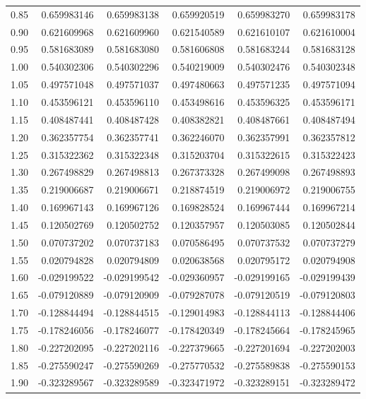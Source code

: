 \documentclass[11pt,a4paper]{article}
\begin{document}
\begin{longtable}{rrrrrr}
0.85 & 0.659983146 & 0.659983138 & 0.659920519 & 0.659983270 & 0.659983178 \\
0.90 & 0.621609968 & 0.621609960 & 0.621540589 & 0.621610107 & 0.621610004 \\
0.95 & 0.581683089 & 0.581683080 & 0.581606808 & 0.581683244 & 0.581683128 \\
1.00 & 0.540302306 & 0.540302296 & 0.540219009 & 0.540302476 & 0.540302348 \\
1.05 & 0.497571048 & 0.497571037 & 0.497480663 & 0.497571235 & 0.497571094 \\
1.10 & 0.453596121 & 0.453596110 & 0.453498616 & 0.453596325 & 0.453596171 \\
1.15 & 0.408487441 & 0.408487428 & 0.408382821 & 0.408487661 & 0.408487494 \\
1.20 & 0.362357754 & 0.362357741 & 0.362246070 & 0.362357991 & 0.362357812 \\
1.25 & 0.315322362 & 0.315322348 & 0.315203704 & 0.315322615 & 0.315322423 \\
1.30 & 0.267498829 & 0.267498813 & 0.267373328 & 0.267499098 & 0.267498893 \\
1.35 & 0.219006687 & 0.219006671 & 0.218874519 & 0.219006972 & 0.219006755 \\
1.40 & 0.169967143 & 0.169967126 & 0.169828524 & 0.169967444 & 0.169967214 \\
1.45 & 0.120502769 & 0.120502752 & 0.120357957 & 0.120503085 & 0.120502844 \\
1.50 & 0.070737202 & 0.070737183 & 0.070586495 & 0.070737532 & 0.070737279 \\
1.55 & 0.020794828 & 0.020794809 & 0.020638568 & 0.020795172 & 0.020794908 \\
1.60 & -0.029199522 & -0.029199542 & -0.029360957 & -0.029199165 & -0.029199439 \\
1.65 & -0.079120889 & -0.079120909 & -0.079287078 & -0.079120519 & -0.079120803 \\
1.70 & -0.128844494 & -0.128844515 & -0.129014983 & -0.128844113 & -0.128844406 \\
1.75 & -0.178246056 & -0.178246077 & -0.178420349 & -0.178245664 & -0.178245965 \\
1.80 & -0.227202095 & -0.227202116 & -0.227379665 & -0.227201694 & -0.227202003 \\
1.85 & -0.275590247 & -0.275590269 & -0.275770532 & -0.275589838 & -0.275590153 \\
1.90 & -0.323289567 & -0.323289589 & -0.323471972 & -0.323289151 & -0.323289472 \\

\end{longtable}
\end{document}
